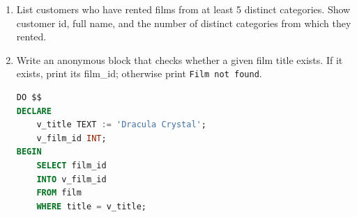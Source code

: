 \documentclass[12pt,a4paper]{article}
\newif\ifshowsolutions
\begin{document}
\begin{enumerate}
\ifshowsolutions
\begin{lstlisting}[language=SQL]
SELECT c.name AS category_name,
       SUM(p.amount) AS total_revenue
FROM category c
JOIN film_category fc ON fc.category_id = c.category_id
JOIN inventory i ON i.film_id = fc.film_id
JOIN rental r ON r.inventory_id = i.inventory_id
JOIN payment p ON p.rental_id = r.rental_id
GROUP BY c.name
ORDER BY total_revenue DESC;
\end{lstlisting}
\fi
\item List customers who have rented films from at least 5 distinct categories. Show customer id, full name, and the number of distinct categories from which they rented.

\ifshowsolutions
\begin{lstlisting}[language=SQL]
SELECT c.customer_id, c.first_name, c.last_name,
       COUNT(DISTINCT fc.category_id) AS distinct_categories
FROM customer c
JOIN rental r ON r.customer_id = c.customer_id
JOIN inventory i ON i.inventory_id = r.inventory_id
JOIN film_category fc ON fc.film_id = i.film_id
GROUP BY c.customer_id, c.first_name, c.last_name
HAVING COUNT(DISTINCT fc.category_id) >= 5
ORDER BY distinct_categories DESC, c.customer_id;
\end{lstlisting}
\fi
\item Write an anonymous block that checks whether a given film title exists. If it exists, print its film\_id; otherwise print \texttt{Film not found}.

\ifshowsolutions
\begin{lstlisting}[language=SQL]
DO $$
DECLARE
    v_title TEXT := 'Dracula Crystal';
    v_film_id INT;
BEGIN
    SELECT film_id
    INTO v_film_id
    FROM film
    WHERE title = v_title;


\end{lstlisting}
\end{enumerate}
\end{document}
